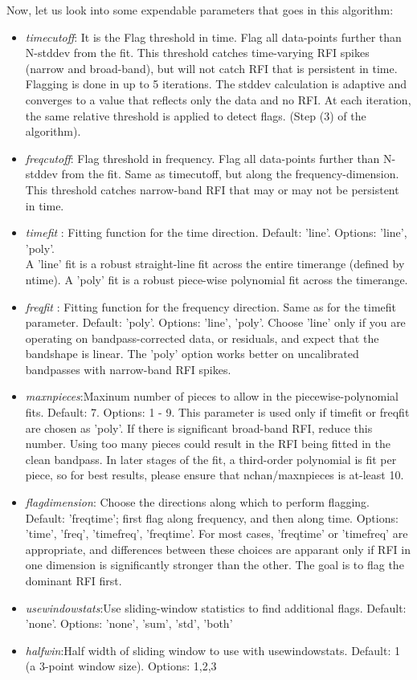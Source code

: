 \documentclass[10pt]{report}
\newcommand{\tit}[1]{\textit{#1}}
\begin{document}
Now, let us look into some expendable parameters that goes in this algorithm:
\begin{itemize}
\item \tit{timecutoff}: It is the Flag threshold in time. Flag all data-points further than N-stddev from the fit. This threshold catches time-varying RFI spikes (narrow and broad-band), but will not catch RFI that is persistent in time. Flagging is done in up to 5 iterations. The stddev calculation is adaptive and converges to a value that reflects only the data and no RFI. At each iteration, the same relative threshold is applied to detect flags. (Step (3) of the algorithm).
\item \tit{freqcutoff}: Flag threshold in frequency. Flag all data-points further than N-stddev from the fit. Same as timecutoff, but along the frequency-dimension. This threshold catches narrow-band RFI that may or may not be persistent in time.
\item \tit{timefit} : Fitting function for the time direction. Default: 'line'. Options: 'line', 'poly'.\\

A 'line' fit is a robust straight-line fit across the entire timerange (defined by ntime). A 'poly' fit is a robust piece-wise polynomial fit across the timerange. 
\item \tit{freqfit} : Fitting function for the frequency direction. Same as for the timefit parameter. Default: 'poly'. Options: 'line', 'poly'. Choose 'line' only if you are operating on bandpass-corrected data, or residuals, and expect that the bandshape is linear. The 'poly' option works better on uncalibrated bandpasses with narrow-band RFI spikes.
\item \tit{maxnpieces}:Maxinum number of pieces to allow in the piecewise-polynomial fits. Default: 7. Options: 1 - 9. This parameter is used only if timefit or freqfit are chosen as 'poly'. If there is significant broad-band RFI, reduce this number. Using too many pieces could result in the RFI being fitted in the clean bandpass. In later stages of the fit, a third-order polynomial is fit per piece, so for best results, please ensure that nchan/maxnpieces is at-least 10.
\item \tit{flagdimension}: Choose the directions along which to perform flagging. Default: 'freqtime'; first flag along frequency, and then along time. Options: 'time', 'freq', 'timefreq', 'freqtime'. For most cases, 'freqtime' or 'timefreq' are appropriate, and differences between these choices are apparant only if RFI in one dimension is significantly stronger than the other. The goal is to flag the dominant RFI first. 
\item \tit{usewindowstats}:Use sliding-window statistics to find additional flags. Default: 'none'. Options: 'none', 'sum', 'std', 'both'
\item \tit{halfwin}:Half width of sliding window to use with usewindowstats. Default: 1 (a 3-point window size). Options: 1,2,3
\end{itemize}
\end{document}
